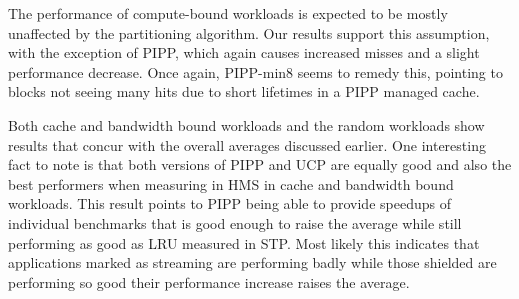 The performance of compute-bound workloads is expected to be mostly unaffected by the partitioning algorithm. 
Our results support this assumption, with the exception of PIPP, which again causes increased misses and a slight performance decrease.
Once again, PIPP-min8 seems to remedy this, pointing to blocks not seeing many hits due to short lifetimes in a PIPP managed cache.

Both cache and bandwidth bound workloads and the random workloads show results that concur with the overall averages discussed earlier.
One interesting fact to note is that both versions of PIPP and UCP are equally good and also the best performers when measuring in HMS in cache and bandwidth bound workloads.
This result points to PIPP being able to provide speedups of individual benchmarks that is good enough to raise the average while still performing as good as LRU measured in STP.
Most likely this indicates that applications marked as streaming are performing badly while those shielded are performing so good their performance increase raises the average.
